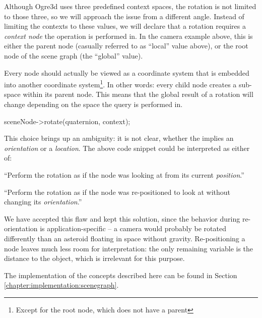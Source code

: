 	Although Ogre3d uses three predefined context spaces, the rotation is not limited to those three, so we will approach the issue from a different angle. Instead of limiting the contexts to these values, we will declare that a rotation requires a \emph{context node} the operation is performed in. In the camera example above, this is either the parent node (casually referred to as ``local'' value above), or the root node of the scene graph (the ``global'' value).

	Every node should actually be viewed as a coordinate system that is embedded into another coordinate system\footnote{Except for the root node, which does not have a parent}. In other words: every child node creates a sub-space within its parent node. This means that the global result of a rotation will change depending on the space the query is performed in.

	\begin{code}[2]
		sceneNode->rotate(quaternion, context);
	\end{code}

	This choice brings up an ambiguity: it is not clear, whether the  implies an \emph{orientation} or a \emph{location}. The above code snippet could be interpreted as either of:

	\begin{smalllist}
		\item ``Perform the rotation as if the  node was looking at  from its current \emph{position}.''
		\item ``Perform the rotation as if the  node was re-positioned to look at  without changing its \emph{orientation}.''
	\end{smalllist}

	We have accepted this flaw and kept this solution, since the behavior during re-orientation is application-specific -- a camera would probably be rotated differently than an asteroid floating in space without gravity. Re-positioning a node leaves much less room for interpretation: the only remaining variable is the distance to the object, which is irrelevant for this purpose.

	The implementation of the concepts described here can be found in Section \ref{chapter:implementation:scenegraph}.

